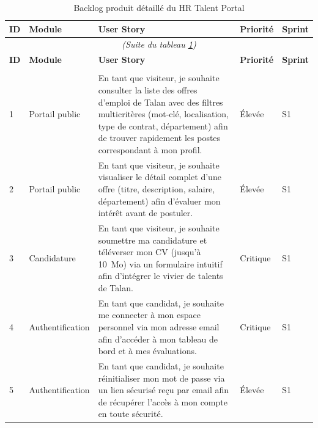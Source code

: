 \begin{longtable}{|p{0.6cm}|p{2.5cm}|p{7.5cm}|p{1.3cm}|p{1.3cm}|}
\caption{Backlog produit détaillé du HR Talent Portal} \label{tab:backlog_detaille} \\
\hline
\rowcolor{gray!20} \textbf{ID} & \textbf{Module} & \textbf{User Story} & \textbf{Priorité} & \textbf{Sprint} \\
\hline
\endfirsthead

\multicolumn{5}{c}{\textit{(Suite du tableau \ref{tab:backlog_detaille})}} \\
\hline
\rowcolor{gray!20} \textbf{ID} & \textbf{Module} & \textbf{User Story} & \textbf{Priorité} & \textbf{Sprint} \\
\hline
\endhead

\hline
\endlastfoot

\multicolumn{5}{|c|}{\cellcolor{blue!10}\textbf{Sprint 1 --- Socle applicatif, identité numérique et portail d'offres}} \\
\hline

1 & Portail public & En tant que visiteur, je souhaite consulter la liste des offres d'emploi de Talan avec des filtres multicritères (mot-clé, localisation, type de contrat, département) afin de trouver rapidement les postes correspondant à mon profil. & Élevée & S1 \\
\hline

2 & Portail public & En tant que visiteur, je souhaite visualiser le détail complet d'une offre (titre, description, salaire, département) afin d'évaluer mon intérêt avant de postuler. & Élevée & S1 \\
\hline

3 & Candidature & En tant que visiteur, je souhaite soumettre ma candidature et téléverser mon CV (jusqu'à 10~Mo) via un formulaire intuitif afin d'intégrer le vivier de talents de Talan. & Critique & S1 \\
\hline

4 & Authentification & En tant que candidat, je souhaite me connecter à mon espace personnel via mon adresse email afin d'accéder à mon tableau de bord et à mes évaluations. & Critique & S1 \\
\hline

5 & Authentification & En tant que candidat, je souhaite réinitialiser mon mot de passe via un lien sécurisé reçu par email afin de récupérer l'accès à mon compte en toute sécurité. & Élevée & S1 \\
\hline


\end{longtable}
